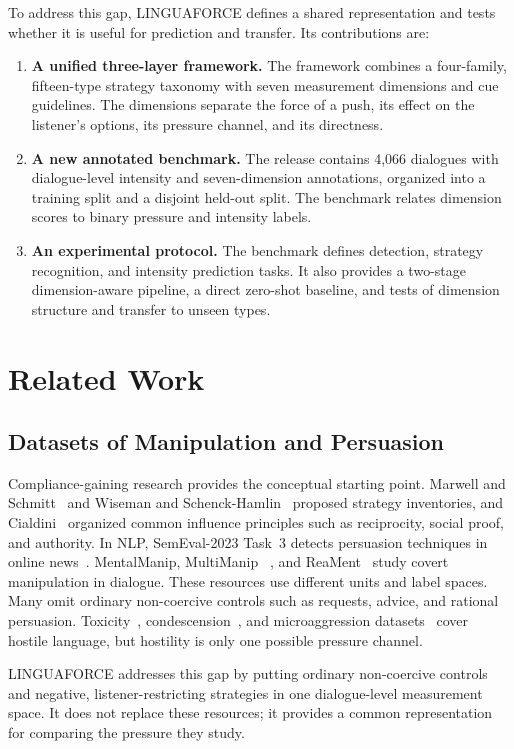 \documentclass[conference]{IEEEtran}
\newcommand{\LNGF}{LINGUAFORCE}
\begin{document}
To address this gap, \LNGF{} defines a shared representation and tests whether
it is useful for prediction and transfer. Its contributions are:
\begin{enumerate}
\item \textbf{A unified three-layer framework.} The framework combines a
four-family, fifteen-type strategy taxonomy with seven measurement dimensions
and cue guidelines. The dimensions separate the force of a push, its
effect on the listener's options, its pressure channel, and its directness.
\item \textbf{A new annotated benchmark.} The release contains 4{,}066
dialogues with dialogue-level intensity and seven-dimension annotations,
organized into a training split and a disjoint held-out split.
The benchmark relates dimension scores to binary pressure and intensity labels.
\item \textbf{An experimental protocol.} The benchmark defines detection,
strategy recognition, and intensity prediction tasks. It also provides a
two-stage dimension-aware pipeline, a direct zero-shot baseline, and tests of
dimension structure and transfer to unseen types.
\end{enumerate}
\section{Related Work}
\subsection{Datasets of Manipulation and Persuasion}
Compliance-gaining research provides the conceptual starting point. Marwell
and Schmitt~\cite{marwell1967} and Wiseman and Schenck-Hamlin~
\cite{wiseman1981} proposed strategy inventories, and Cialdini~
\cite{cialdini1984} organized common influence principles such as reciprocity,
social proof, and authority. In NLP, SemEval-2023 Task~3 detects persuasion
techniques in online news~\cite{piskorski2023}. MentalManip, MultiManip~
\cite{mentalmanip,multimanip}, and ReaMent~\cite{reament} study covert
manipulation in dialogue. These resources use different units and label
spaces. Many omit ordinary non-coercive controls such as requests, advice, and rational
persuasion. Toxicity~\cite{toxicchat2023}, condescension~\cite{talkdown2023},
and microaggression datasets~\cite{breitfeller2019} cover hostile language,
but hostility is only one possible pressure channel.

\LNGF{} addresses this gap by putting ordinary non-coercive controls and negative,
listener-restricting strategies in one dialogue-level measurement space. It
does not replace these resources; it provides a common representation for
comparing the pressure they study.
\end{document}
